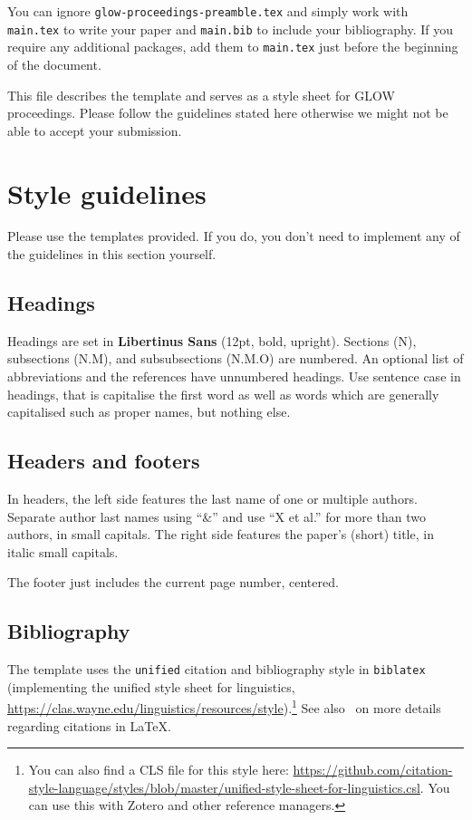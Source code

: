 You can ignore \texttt{glow-proceedings-preamble.tex} and simply work with
\texttt{main.tex} to write your paper and \texttt{main.bib} to include your
bibliography. If you require any additional packages, add them to
\texttt{main.tex} just before the beginning of the document.

This file describes the template and serves as a style sheet for GLOW proceedings.
Please follow the guidelines stated here otherwise we might not be able to accept
your submission.

\section{Style guidelines}

Please use the templates provided. If you do, you don't need to implement any of
the guidelines in this section yourself.

\subsection{Headings}

Headings are set in \textsf{\textbf{Libertinus Sans}} (12pt, bold, upright).
Sections (N), subsections (N.M), and subsubsections (N.M.O) are numbered. An
optional list of abbreviations and the references have unnumbered headings.
Use sentence case in headings, that is capitalise the first word as well as
words which are generally capitalised such as proper names, but nothing else.

\subsection{Headers and footers}

In headers, the left side features the last name of one or multiple authors.
Separate author last names using \enquote{\&} and use \enquote{X et al.} for
more than two authors, in small capitals. The right side features the paper's
(short) title, in italic small capitals.

The footer just includes the current page number, centered.

\subsection{Bibliography}

The template uses the \texttt{unified} citation and bibliography style in
\texttt{biblatex} (implementing the unified style sheet for linguistics,
\url{https://clas.wayne.edu/linguistics/resources/style}).\footnote{You can also
find a CLS file for this style here:
\url{https://github.com/citation-style-language/styles/blob/master/unified-style-sheet-for-linguistics.csl}.
You can use this with Zotero and other reference managers.} See
also~ on more details regarding citations in \LaTeX.

